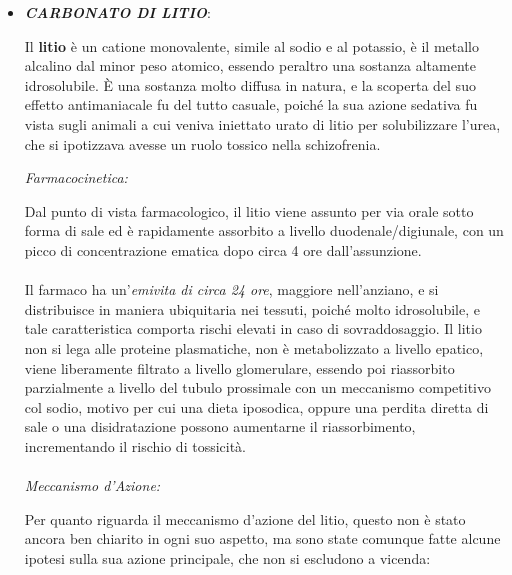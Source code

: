 \begin{itemize}
\item
  \textbf{\emph{CARBONATO DI LITIO}}:

Il \textbf{litio} è un catione monovalente, simile al sodio e al
potassio, è il metallo alcalino dal minor peso atomico, essendo peraltro
una sostanza altamente idrosolubile. È una sostanza molto diffusa in
natura, e la scoperta del suo effetto antimaniacale fu del tutto
casuale, poiché la sua azione sedativa fu vista sugli animali a cui
veniva iniettato urato di litio per solubilizzare l'urea, che si
ipotizzava avesse un ruolo tossico nella schizofrenia.

\emph{\emph{Farmacocinetica:}}

Dal punto di vista farmacologico, il litio viene assunto per via orale
sotto forma di sale ed è rapidamente assorbito a livello
duodenale/digiunale, con un picco di concentrazione ematica dopo circa 4
ore dall'assunzione.
\\\\
Il farmaco ha un'\emph{emivita di circa 24 ore}, maggiore nell'anziano,
e si distribuisce in maniera ubiquitaria nei tessuti, poiché molto
idrosolubile, e tale caratteristica comporta rischi elevati in caso di
sovraddosaggio. Il litio non si lega alle proteine plasmatiche, non è
metabolizzato a livello epatico, viene liberamente filtrato a livello
glomerulare, essendo poi riassorbito parzialmente a livello del tubulo
prossimale con un meccanismo competitivo col sodio, motivo per cui una
dieta iposodica, oppure una perdita diretta di sale o una disidratazione
possono aumentarne il riassorbimento, incrementando il rischio di
tossicità.
\\\\
\emph{\emph{Meccanismo d'Azione:}}

Per quanto riguarda il meccanismo d'azione del litio, questo non è stato
ancora ben chiarito in ogni suo aspetto, ma sono state comunque fatte
alcune ipotesi sulla sua azione principale, che non si escludono a
vicenda:


\end{itemize}
